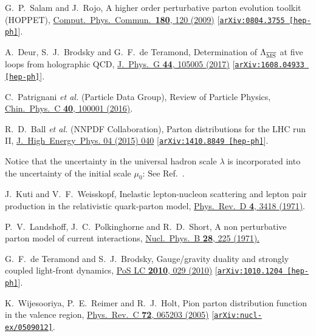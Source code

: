 \documentclass[aps,prl,reprint,groupedaddress, preprintnumbers]{revtex4-1}
\begin{document}
\begin{thebibliography}{50}
  
  G.~P.~Salam and J.~Rojo,
  A higher order perturbative parton evolution toolkit (HOPPET),
  \href{https://doi.org/10.1016/j.cpc.2008.08.010}{Comput.\ Phys.\ Commun.\  {\bf 180}, 120 (2009)}
  [\href{https://arxiv.org/abs/0804.3755}{\tt arXiv:0804.3755 [hep-ph]}].


  A.~Deur, S.~J.~Brodsky and G.~F.~de Teramond,
  Determination of $\Lambda_{\overline{\rm MS}}$ at five loops from holographic QCD,
  \href{https://doi.org/10.1088/1361-6471/aa888a}{J.\ Phys.\ G {\bf 44}, 105005 (2017)}
  [\href{https://arxiv.org/abs/1608.04933}{\tt arXiv:1608.04933 [hep-ph]}].
  
  
  C.~Patrignani {\it et al.} (Particle Data Group),
  Review of Particle Physics,
  \href{https://doi.org/10.1088/1674-1137/40/10/100001}{Chin.\ Phys.\ C {\bf 40}, 100001 (2016)}.
 

  R.~D.~Ball {\it et al.} (NNPDF Collaboration),
  Parton distributions for the LHC run II,
  \href{https://doi.org/10.1007/JHEP04(2015)040}{J.\ High\ Energy\ Phys. 04 (2015) 040}
  [\href{https://arxiv.org/abs/1410.8849v4}{\tt arXiv:1410.8849 [hep-ph]}].
  
 
 Notice that the uncertainty in the universal hadron scale $\lambda$ is incorporated into the uncertainty of the initial scale $\mu_0$: See Ref.~\cite{Deur:2016opc}.
  

J.~Kuti and V.~F.~Weisskopf,
  Inelastic lepton-nucleon scattering and lepton pair production in the relativistic quark-parton model,
  \href{https://doi.org/10.1103/PhysRevD.4.3418}{Phys.\ Rev.\ D {\bf 4}, 3418 (1971)}.  
  
  
  P.~V.~Landshoff, J.~C.~Polkinghorne and R.~D.~Short,
  A non perturbative parton model of current interactions,
  \href{https://www.sciencedirect.com/science/article/pii/0550321371903750?via%3Dihub}{Nucl.\ Phys.\ B {\bf 28}, 225 (1971).}
  
  
  G.~F.~de Teramond and S.~J.~Brodsky,
  Gauge/gravity duality and strongly coupled light-front dynamics,
  \href{https://pos.sissa.it/119/029/}{PoS LC {\bf 2010}, 029 (2010)}
  [\href{https://arxiv.org/abs/1010.1204}{\tt arXiv:1010.1204 [hep-ph]}].    
  
  
  K.~Wijesooriya, P.~E.~Reimer and R.~J.~Holt,
  Pion parton distribution function in the valence region,
  \href{https://doi.org/10.1103/PhysRevC.72.065203}{Phys.\ Rev.\ C {\bf 72}, 065203 (2005)}
  [\href{https://arxiv.org/abs/nucl-ex/0509012}{\tt arXiv:nucl-ex/0509012]}.



\end{thebibliography}
\end{document}
